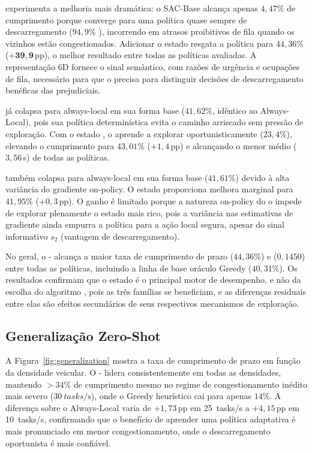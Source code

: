  experimenta a melhoria mais dramática:
o SAC-Base alcança apenas $4{,}47\%$ de cumprimento porque converge para uma
política quase sempre de descarregamento ($94{,}9\%$ ), incorrendo em
atrasos proibitivos de fila quando os vizinhos estão congestionados.
Adicionar o estado  resgata a política para $44{,}36\%$
($\mathbf{+39{,}9}$\,pp), o melhor resultado entre todas as políticas avaliadas.
A representação 6D fornece o sinal semântico, com razões de urgência e ocupações de
fila, necessário para que o  precisa para distinguir decisões de descarregamento benéficas
das prejudiciais.

 já colapsa para always-local em sua forma base ($41{,}62\%$,
idêntico ao Always-Local), pois sua política determinística evita o caminho
arriscado  sem pressão de exploração.
Com o estado , o  aprende a explorar  oportunisticamente
($23{,}4\%$), elevando o cumprimento para $43{,}01\%$ ($+1{,}4$\,pp) e
alcançando o menor  médio ($3{,}56$\,s) de todas as políticas.

 também colapsa para always-local em sua forma base ($41{,}61\%$)
devido à alta variância do gradiente on-policy.
O estado  proporciona melhora marginal para $41{,}95\%$ ($+0{,}3$\,pp).
O ganho é limitado porque a natureza on-policy do  o impede de explorar
plenamente o estado mais rico, pois a variância nas estimativas de gradiente ainda
empurra a política para a ação local segura, apesar do sinal informativo $s_2$
(vantagem de descarregamento).

No geral, o - alcança a maior taxa de cumprimento de prazo
($44{,}36\%$) e  ($0{,}1450$) entre todas as políticas, incluindo a linha
de base oráculo Greedy ($40{,}31\%$).
Os resultados confirmam que o estado  é o principal motor de
desempenho, e não da escolha do algoritmo , pois as três famílias se beneficiam,
e as diferenças residuais entre elas são efeitos secundários de seus respectivos
mecanismos de exploração.

\subsection{Generalização Zero-Shot}

A Figura~\ref{fig:generalization} mostra a taxa de cumprimento de prazo em
função da densidade veicular.
O - lidera consistentemente em todas as densidades, mantendo $>34\%$
de cumprimento mesmo no regime de congestionamento inédito mais severo
($\SI{30}{tasks\per\second}$), onde o Greedy heurístico cai para apenas $14\%$.
A diferença sobre o Always-Local varia de $+1{,}73$\,pp em 25~tasks/s a
$+4{,}15$\,pp em 10~tasks/s, confirmando que o benefício de aprender uma
política adaptativa é mais pronunciado em menor congestionamento, onde o
descarregamento  oportunista é mais confiável.


